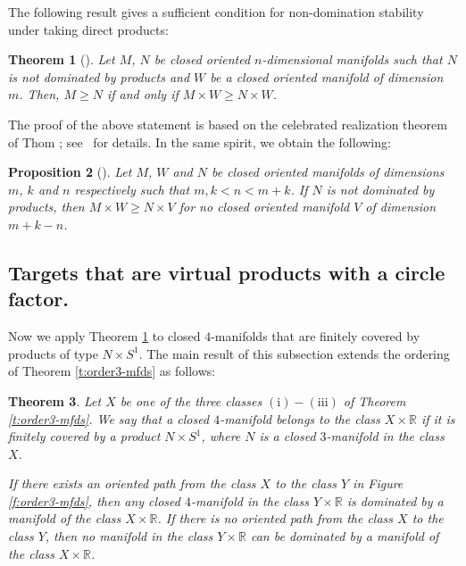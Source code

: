 \documentclass[12pt]{amsart}
\newtheorem{thm}{Theorem}[section]
\newtheorem{prop}[thm]{Proposition}
\theoremstyle{remark}
\begin{document}
The following result gives a sufficient condition for non-domination stability under taking direct products:

\begin{thm}[\cite{KotschickLoehNeofytidis,Neothesis}]\label{t:mapsbetweenproducts}
 Let $M$, $N$ be closed oriented $n$-dimensional manifolds such that $N$ is not dominated by products and $W$ be a closed oriented manifold of dimension $m$. Then, $M \geq N$ if and only if $M \times W \geq N \times W$.
\end{thm}

The proof of the above statement is based on the celebrated realization theorem of Thom \cite{Thom}; see~\cite{KotschickLoehNeofytidis,Neothesis} for details. In the same spirit, we obtain the following:

\begin{prop}[\cite{KotschickLoehNeofytidis,Neothesis}]\label{c:productslower}
 Let $M$, $W$ and $N$ be closed oriented manifolds of dimensions $m$, $k$ and $n$ respectively such that $m,k<n<m+k$. If $N$ is not dominated by
products, then $M\times W\geq N\times V$ for no closed oriented manifold $V$ of dimension $m+k-n$.
\end{prop}

\subsection{Targets that are virtual products with a circle factor.}

Now we apply Theorem \ref{t:mapsbetweenproducts} to closed $4$-manifolds that are finitely covered by products of type $N \times S^1$. The main result
of this subsection extends the ordering of Theorem \ref{t:order3-mfds} as follows:

\begin{thm}\label{t:4Dwangorder}
Let $X$ be one of the three classes $\mathrm{(i)-(iii)}$ of Theorem \ref{t:order3-mfds}. We say that a closed $4$-manifold belongs to the class $X
\times {\mathbb{R}}$ if it is finitely covered by a product $N \times S^1$, where $N$ is a closed $3$-manifold in the class $X$.

If there exists an oriented path from the class $X$ to the class $Y$ in Figure \ref{f:order3-mfds}, then any closed $4$-manifold in the class $Y \times
{\mathbb{R}}$ is dominated by a manifold of the class $X \times {\mathbb{R}}$. If there is no oriented path from the class $X$ to the class $Y$, then no manifold in the
class $Y \times {\mathbb{R}}$ can be dominated by a manifold of the class $X \times {\mathbb{R}}$.
\end{thm}
\end{document}
